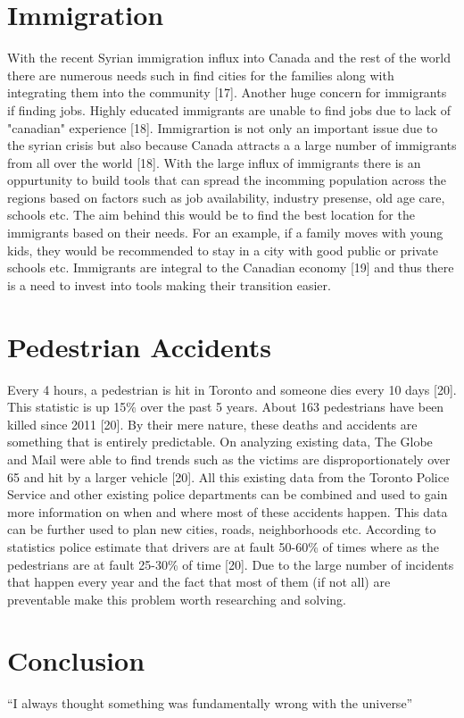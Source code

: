 \documentclass{article}
\begin{document}
\section{Immigration}
With the recent Syrian immigration influx into Canada and the rest of the world there are numerous needs such in find cities for the families along with integrating them into the community [17]. Another huge concern for immigrants if finding jobs. Highly educated immigrants are unable to find jobs due to lack of "canadian" experience [18]. Immigrartion is not only an important issue due to the syrian crisis but also because Canada attracts a a large number of immigrants from all over the world [18]. With the large influx of immigrants there is an oppurtunity to build tools that can spread the incomming population across the regions based on factors such as job availability, industry presense, old age care, schools etc. The aim behind this would be to find the best location for the immigrants based on their needs. For an example, if a family moves with young kids, they would be recommended to stay in a city with good public or private schools etc. Immigrants are integral to the Canadian economy [19] and thus there is a need to invest into tools making their transition easier.

\section{Pedestrian Accidents}
Every 4 hours, a pedestrian is hit in Toronto and someone dies every 10 days [20]. This statistic is up 15\% over the past 5 years. About 163 pedestrians have been killed since 2011 [20]. By their mere nature, these deaths and accidents are something that is entirely predictable. On analyzing existing data, The Globe and Mail were able to find trends such as the victims are disproportionately over 65 and hit by a larger vehicle [20]. All this existing data from the Toronto Police Service and other existing police departments can be combined and used to gain more information on when and where most of these accidents happen. This data can be further used to plan new cities, roads, neighborhoods etc. According to statistics police estimate that drivers are at fault 50-60\% of times where as the pedestrians are at fault 25-30\% of time [20]. Due to the large number of incidents that happen every year and the fact that most of them (if not all) are preventable make this problem worth researching and solving.

\section{Conclusion}
``I always thought something was fundamentally wrong with the universe'' \citep{adams}
\end{document}
